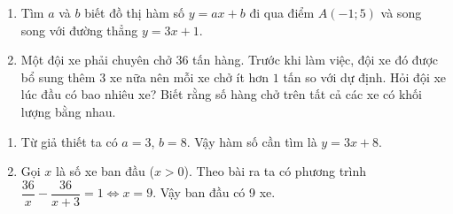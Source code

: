\begin{ex}%
   \hfill
   \begin{enumerate}
   	\item Tìm $a$ và $b$ biết đồ thị hàm số $y = ax + b$ đi qua điểm $A(-1; 5)$ và song song với đường thẳng $y=3x + 1$.
   	\item Một đội xe phải chuyên chở $36$ tấn hàng. Trước khi làm việc, đội xe đó được bổ sung thêm $3$ xe nữa nên mỗi xe chở ít hơn $1$ tấn so với dự định. Hỏi đội xe lúc đầu có bao nhiêu xe? Biết rằng số hàng chở trên tất cả các xe có khối lượng bằng nhau.
   \end{enumerate}
\loigiai
    {
    \begin{enumerate}
        \item Từ giả thiết ta có $a=3$, $b=8$. Vậy hàm số cần tìm là $y=3x+8$.
        \item Gọi $x$ là số xe ban đầu ($x>0$). Theo bài ra ta có phương trình $\dfrac{36}{x}-\dfrac{36}{x+3}=1\Leftrightarrow x=9$. Vậy ban đầu có 9 xe.
    \end{enumerate}
    }
\end{ex}

